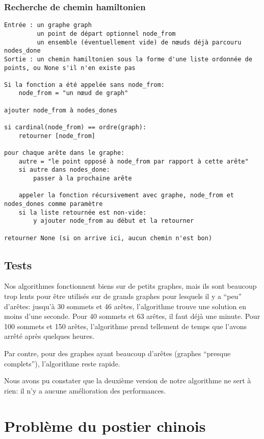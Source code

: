 \documentclass{scrartcl}
\begin{document}
    \subsubsection{Recherche de chemin hamiltonien}
      \begin{lstlisting}
Entrée : un graphe graph
         un point de départ optionnel node_from
         un ensemble (éventuellement vide) de nœuds déjà parcouru nodes_done
Sortie : un chemin hamiltonien sous la forme d'une liste ordonnée de points, ou None s'il n'en existe pas

Si la fonction a été appelée sans node_from:
    node_from = "un nœud de graph"

ajouter node_from à nodes_dones

si cardinal(node_from) == ordre(graph):
    retourner [node_from]

pour chaque arête dans le graphe:
    autre = "le point opposé à node_from par rapport à cette arête"
    si autre dans nodes_done:
        passer à la prochaine arête

    appeler la fonction récursivement avec graphe, node_from et nodes_dones comme paramètre
    si la liste retournée est non-vide:
        y ajouter node_from au début et la retourner

retourner None (si on arrive ici, aucun chemin n'est bon)
      \end{lstlisting}

  \subsection{Tests}
    Nos algorithmes fonctionnent biens sur de petits graphes, mais ils sont
    beaucoup trop lents pour être utilisés sur de grands graphes pour lesquels
    il y a ``peu'' d'arêtes: jusqu'à 30 sommets et 46 arêtes, l'algorithme
    trouve une solution en moins d'une seconde. Pour 40 sommets et 63 arêtes,
    il faut déjà une minute. Pour 100 sommets et 150 arêtes, l'algorithme
    prend tellement de temps que l'avons arrêté après quelques heures.

    Par contre, pour des graphes ayant beaucoup d'arêtes (graphes ``presque
    complets''), l'algorithme reste rapide.

    Nous avons pu constater que la deuxième version de notre algorithme ne sert
    à rien: il n'y a aucune amélioration des performances.

\section{Problème du postier chinois}
\end{document}
